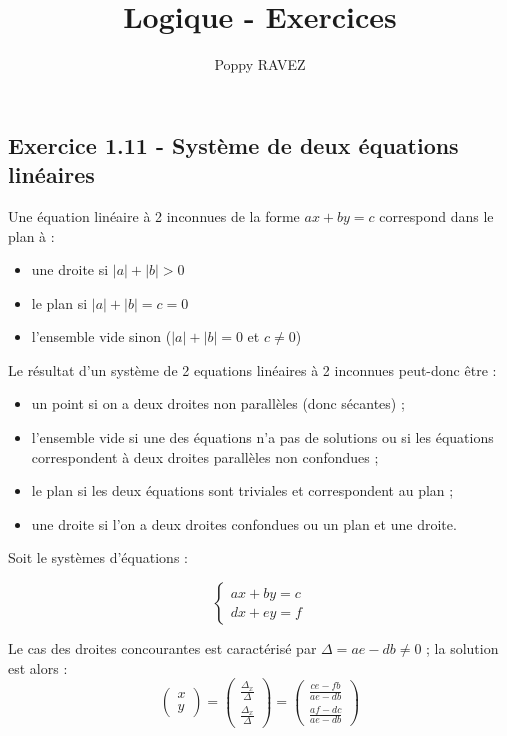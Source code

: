 \documentclass[a4paper,10pt]{report}
\title{Logique - Exercices}
\author{Poppy RAVEZ}
\begin{document}
	
	
\subsection*{Exercice 1.11 - Système de deux équations linéaires}

Une équation linéaire à 2 inconnues de la forme $ax +by = c$ correspond dans le plan à :
\begin{itemize}
	\item une droite si $|a| + |b| > 0$
	\item le plan si $|a|+|b|= c = 0$
	\item l'ensemble vide sinon ($|a|+|b|=0$ et $c\neq0$)
\end{itemize}

Le résultat d'un système de 2 equations linéaires à 2 inconnues peut-donc être :
\begin{itemize}
	\item un point si on a deux droites non parallèles (donc sécantes) ;
	\item l'ensemble vide si une des équations n'a pas de solutions ou si les équations
	      correspondent à deux droites parallèles non confondues ;
	\item le plan si les deux équations sont triviales et correspondent au plan ;
	\item une droite si l'on a deux droites confondues ou un plan et une droite.
\end{itemize}

Soit le systèmes d'équations :

\begin{displaymath}
\begin{cases}
	ax + by = c \\
	dx + ey = f
\end{cases}
\end{displaymath}

Le cas des droites concourantes est caractérisé par $\Delta = ae - db \neq 0$ ; la solution est alors :
\begin{displaymath}
\begin{pmatrix}
	x \\ y
\end{pmatrix}
=	
\begin{pmatrix}
	\frac{\Delta_x}{\Delta} \\
	\frac{\Delta_x}{\Delta}
\end{pmatrix}
=
\begin{pmatrix}
	\frac{ce-fb}{ae-db} \\
	\frac{af-dc}{ae-db}
\end{pmatrix}
\end{displaymath}
\end{document}
